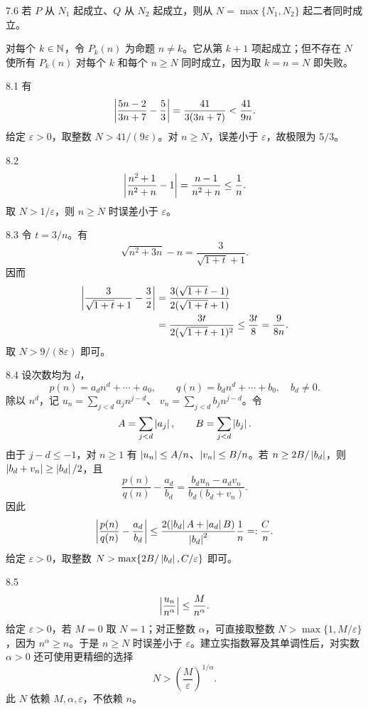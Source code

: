\begin{solution}{7.6}
若 \(P\) 从 \(N_1\) 起成立、\(Q\) 从 \(N_2\) 起成立，则从
\(N=\max\{N_1,N_2\}\) 起二者同时成立。

对每个 \(k\in\mathbb{N}\)，令 \(P_k(n)\) 为命题 \(n\ne k\)。它从第 \(k+1\) 项起成立；但不存在 \(N\) 使所有 \(P_k(n)\) 对每个 \(k\) 和每个 \(n\ge N\) 同时成立，因为取 \(k=n=N\) 即失败。
\end{solution}

\begin{solution}{8.1}
有
\[
 \left|\frac{5n-2}{3n+7}-\frac53\right|
 =\frac{41}{3(3n+7)}<\frac{41}{9n}.
\]
给定 \(\varepsilon>0\)，取整数 \(N>41/(9\varepsilon)\)。对 \(n\ge N\)，误差小于 \(\varepsilon\)，故极限为 \(5/3\)。
\end{solution}

\begin{solution}{8.2}
\[
 \left|\frac{n^2+1}{n^2+n}-1\right|
 =\frac{n-1}{n^2+n}\le\frac1n.
\]
取 \(N>1/\varepsilon\)，则 \(n\ge N\) 时误差小于 \(\varepsilon\)。
\end{solution}

\begin{solution}{8.3}
令 \(t=3/n\)。有
\[
 \sqrt{n^2+3n}-n=\frac3{\sqrt{1+t}+1}.
\]
因而
\[
\begin{aligned}
\left|\frac3{\sqrt{1+t}+1}-\frac32\right|
&=\frac{3(\sqrt{1+t}-1)}{2(\sqrt{1+t}+1)}\\
&=\frac{3t}{2(\sqrt{1+t}+1)^2}
\le\frac{3t}{8}=\frac9{8n}.
\end{aligned}
\]
取 \(N>9/(8\varepsilon)\) 即可。
\end{solution}

\begin{solution}{8.4}
设次数均为 \(d\)，
\[
 p(n)=a_dn^d+\cdots+a_0,\qquad
 q(n)=b_dn^d+\cdots+b_0,\quad b_d\ne0.
\]
除以 \(n^d\)，记
\(u_n=\sum_{j<d}a_jn^{j-d}\)、
\(v_n=\sum_{j<d}b_jn^{j-d}\)。令
\[
 A=\sum_{j<d}\left|a_j\right|,\qquad B=\sum_{j<d}\left|b_j\right|.
\]
由于 \(j-d\le-1\)，对 \(n\ge1\) 有
\(\left|u_n\right|\le A/n\)、\(\left|v_n\right|\le B/n\)。若
\(n\ge 2B/\left|b_d\right|\)，则
\(\left|b_d+v_n\right|\ge\left|b_d\right|/2\)，且
\[
 \frac{p(n)}{q(n)}-\frac{a_d}{b_d}
 =\frac{b_du_n-a_dv_n}{b_d(b_d+v_n)}.
\]
因此
\[
 \left|\frac{p(n)}{q(n)}-\frac{a_d}{b_d}\right|
 \le
 \frac{2(\left|b_d\right|A+\left|a_d\right|B)}{\left|b_d\right|^2}\frac1n
 =:\frac Cn.
\]
给定 \(\varepsilon>0\)，取整数
\(
 N>\max\{2B/\left|b_d\right|,C/\varepsilon\}
\)
即可。
\end{solution}

\begin{solution}{8.5}
\[
 \left|\frac{u_n}{n^\alpha}\right|\le\frac M{n^\alpha}.
\]
给定 \(\varepsilon>0\)，若 \(M=0\) 取 \(N=1\)；对正整数 \(\alpha\)，可直接取整数 \(N>\max\{1,M/\varepsilon\}\)，因为 \(n^\alpha\ge n\)。于是 \(n\ge N\) 时误差小于 \(\varepsilon\)。建立实指数幂及其单调性后，对实数 \(\alpha>0\) 还可使用更精细的选择
\[
 N>\left(\frac M\varepsilon\right)^{1/\alpha}.
\]
此 \(N\) 依赖 \(M,\alpha,\varepsilon\)，不依赖 \(n\)。
\end{solution}

